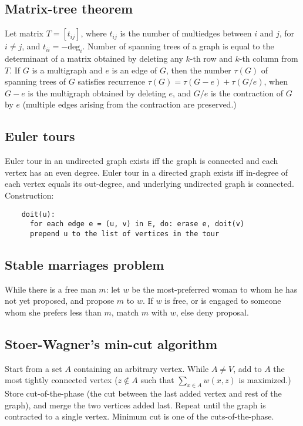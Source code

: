 \documentclass[12pt]{extarticle}
\begin{document}
\begin{multicols*}{2}
\subsection{Matrix-tree theorem}
Let matrix $T = [t_{ij}]$, where $t_{ij}$ is the number of multiedges
between $i$ and $j$, for $i \ne j$, and $t_{ii} = -\mbox{deg}_i$.
Number of spanning trees of a graph is equal to the determinant of
a matrix obtained by deleting any $k$-th row and $k$-th column from $T$.
If $G$ is a multigraph and $e$ is an edge of $G$, then the number $\tau(G)$ of
spanning trees of $G$ satisfies recurrence $\tau(G) = \tau(G-e) + \tau(G/e)$,
when $G-e$ is the multigraph obtained by deleting $e$, and $G/e$ is
the contraction of $G$ by $e$ (multiple edges arising from the contraction
are preserved.)

\subsection{Euler tours}
Euler tour in an undirected graph exists iff the graph is connected and each
vertex has an even degree.  Euler tour in a directed graph exists iff in-degree
of each vertex equals its out-degree, and underlying undirected graph is connected.
Construction:
\vspace{-5mm}
\begin{verbatim}
    doit(u):
      for each edge e = (u, v) in E, do: erase e, doit(v)
      prepend u to the list of vertices in the tour
\end{verbatim}
\vspace{-2mm}


\subsection{Stable marriages problem}
While there is a free man $m$: let $w$ be the most-preferred woman to whom he
has not yet proposed, and propose $m$ to $w$. If $w$ is free, or is engaged to someone whom
she prefers less than $m$, match $m$ with $w$, else deny proposal.



\subsection{Stoer-Wagner's min-cut algorithm}
Start from a set $A$ containing an arbitrary vertex.
While $A \ne V$, add to $A$ the most tightly connected vertex
($z \notin A$ such that $\sum_{x \in A} w(x, z)$ is maximized.)
Store cut-of-the-phase (the cut between the last added vertex and rest of
the graph), and merge the two vertices added last.  Repeat until the graph
is contracted to a single vertex.  Minimum cut is one of the cuts-of-the-phase.




\end{multicols*}
\end{document}
